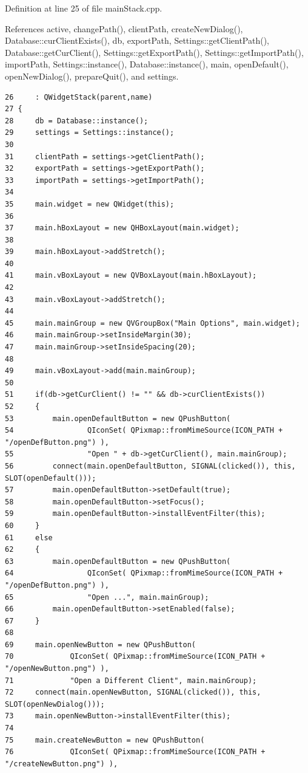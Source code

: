 Definition at line 25 of file main\-Stack.cpp.

References active, change\-Path(), client\-Path, create\-New\-Dialog(), Database::cur\-Client\-Exists(), db, export\-Path, Settings::get\-Client\-Path(), Database::get\-Cur\-Client(), Settings::get\-Export\-Path(), Settings::get\-Import\-Path(), import\-Path, Settings::instance(), Database::instance(), main, open\-Default(), open\-New\-Dialog(), prepare\-Quit(), and settings.

\footnotesize\begin{verbatim}26     : QWidgetStack(parent,name)
27 {
28     db = Database::instance();
29     settings = Settings::instance();
30 
31     clientPath = settings->getClientPath();
32     exportPath = settings->getExportPath();
33     importPath = settings->getImportPath();
34     
35     main.widget = new QWidget(this);
36     
37     main.hBoxLayout = new QHBoxLayout(main.widget);
38     
39     main.hBoxLayout->addStretch();
40     
41     main.vBoxLayout = new QVBoxLayout(main.hBoxLayout);
42     
43     main.vBoxLayout->addStretch();
44     
45     main.mainGroup = new QVGroupBox("Main Options", main.widget);
46     main.mainGroup->setInsideMargin(30);
47     main.mainGroup->setInsideSpacing(20);
48     
49     main.vBoxLayout->add(main.mainGroup);
50     
51     if(db->getCurClient() != "" && db->curClientExists())
52     {
53         main.openDefaultButton = new QPushButton(
54                 QIconSet( QPixmap::fromMimeSource(ICON_PATH + "/openDefButton.png") ),
55                 "Open " + db->getCurClient(), main.mainGroup);
56         connect(main.openDefaultButton, SIGNAL(clicked()), this, SLOT(openDefault()));
57         main.openDefaultButton->setDefault(true);
58         main.openDefaultButton->setFocus();
59         main.openDefaultButton->installEventFilter(this);
60     }
61     else
62     {
63         main.openDefaultButton = new QPushButton(
64                 QIconSet( QPixmap::fromMimeSource(ICON_PATH + "/openDefButton.png") ),
65                 "Open ...", main.mainGroup);
66         main.openDefaultButton->setEnabled(false);
67     }
68     
69     main.openNewButton = new QPushButton(
70             QIconSet( QPixmap::fromMimeSource(ICON_PATH + "/openNewButton.png") ),
71             "Open a Different Client", main.mainGroup);
72     connect(main.openNewButton, SIGNAL(clicked()), this, SLOT(openNewDialog()));
73     main.openNewButton->installEventFilter(this);
74     
75     main.createNewButton = new QPushButton(
76             QIconSet( QPixmap::fromMimeSource(ICON_PATH + "/createNewButton.png") ),

\end{verbatim}
